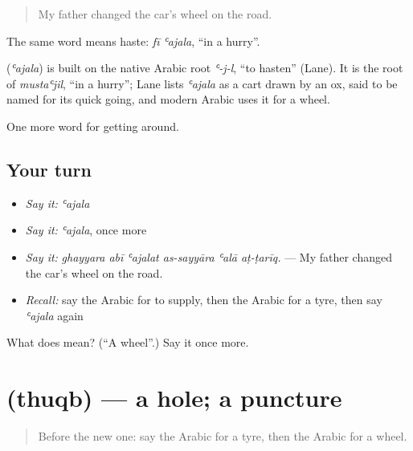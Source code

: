 \begin{quote}
My father changed the car's wheel on the road.
\end{quote}

The same word means haste: \emph{fī ʿajala}, \textquotedblleft{}in a hurry\textquotedblright{}.

\begin{cousinweb}
\textbf{} (\emph{ʿajala}) is built on the native Arabic root \emph{ʿ-j-l}, \textquotedblleft{}to hasten\textquotedblright{} (Lane). It is the root of \emph{mustaʿjil}, \textquotedblleft{}in a hurry\textquotedblright{}; Lane lists \emph{ʿajala} as a cart drawn by an ox, said to be named for its quick going, and modern Arabic uses it for a wheel.
\end{cousinweb}

\begin{grammarlens}[title={What you've built}]
One more word for getting around.
\end{grammarlens}

\subsection*{Your turn}
\begin{itemize}
\raggedright
  \item \emph{Say it:} \emph{ʿajala}
  \item \emph{Say it:} \emph{ʿajala}, once more
  \item \emph{Say it:} \emph{ghayyara abī ʿajalat as-sayyāra ʿalā aṭ-ṭarīq.} — My father changed the car's wheel on the road.
  \item \emph{Recall:} say the Arabic for to supply, then the Arabic for a tyre, then say \emph{ʿajala} again
\end{itemize}

\begin{tcolorbox}[breakable,colback=teal!4,colframe=teal!35!black,title={Before you move on}]
What does  mean? (\textquotedblleft{}A wheel\textquotedblright{}.) Say it once more.
\end{tcolorbox}
\section[\texorpdfstring{\ar{ثقب} (thuqb)}{ثقب (thuqb)}]{ (thuqb) — a hole; a puncture}

\label{lesson:AR-C433-thuqb}



\begin{quote}
Before the new one: say the Arabic for a tyre, then the Arabic for a wheel.
\end{quote}


